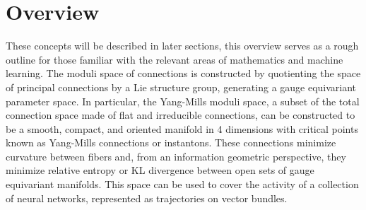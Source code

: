 \documentclass{article}
\newcommand{\resumetocwriting}{%
  \addtocontents{toc}{\protect\setcounter{tocdepth}{\arabic{tocdepth}}}}
\begin{document}
\tableofcontents





\newpage
\section{Overview}
These concepts will be described in later sections, this overview serves as a rough outline for those familiar with the relevant areas of mathematics and machine learning.
The moduli space of connections is constructed by quotienting the space of principal connections by a Lie structure group, generating a gauge equivariant parameter space.  
In particular, the Yang-Mills moduli space, a subset of the total connection space made of flat and irreducible connections, can be constructed to be a smooth, compact, and oriented manifold in 4 dimensions with critical points known as Yang-Mills connections or instantons. These connections minimize curvature between fibers and, from an information geometric perspective, they minimize relative entropy or KL divergence between open sets of gauge equivariant manifolds. 
This space can be used to cover the activity of a collection of neural networks, represented as trajectories on vector bundles. 
\end{document}
